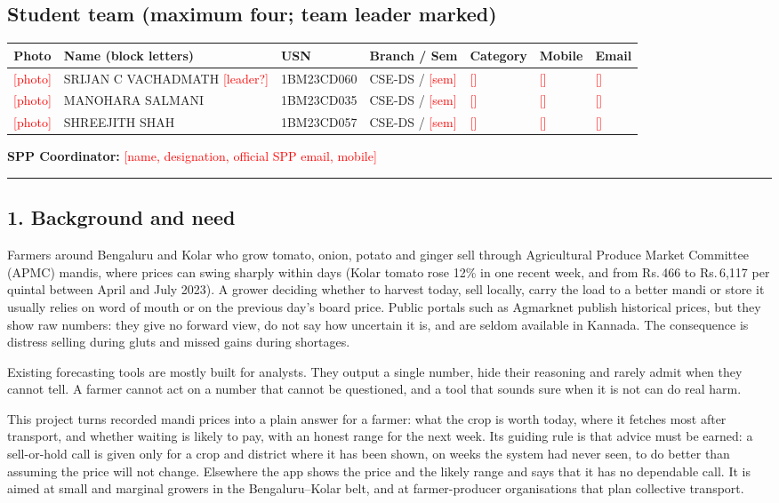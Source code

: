 \documentclass[11pt,a4paper]{article}
\newcommand{\todo}[1]{\textcolor{red}{[#1]}}
\newcommand{\psec}[1]{\vspace{4pt}\noindent{\large\bfseries #1}\par\vspace{1pt}\hrule\vspace{4pt}}
\begin{document}
\subsection*{Student team (maximum four; team leader marked)}
\begin{tabularx}{\textwidth}{@{}c>{\raggedright}p{3.4cm}lllll@{}}
\toprule
Photo & Name (block letters) & USN & Branch / Sem & Category & Mobile & Email\\
\midrule
\todo{photo} & SRIJAN C VACHADMATH \todo{leader?} & 1BM23CD060 & CSE-DS / \todo{sem} & \todo{} & \todo{} & \todo{}\\
\todo{photo} & MANOHARA SALMANI & 1BM23CD035 & CSE-DS / \todo{sem} & \todo{} & \todo{} & \todo{}\\
\todo{photo} & SHREEJITH SHAH & 1BM23CD057 & CSE-DS / \todo{sem} & \todo{} & \todo{} & \todo{}\\
\bottomrule
\end{tabularx}

\textbf{SPP Coordinator:} \todo{name, designation, official SPP email, mobile}

\psec{PART B: PROJECT DESCRIPTION}

\subsection*{1. Background and need}
Farmers around Bengaluru and Kolar who grow tomato, onion, potato and ginger sell through Agricultural Produce Market Committee (APMC) mandis, where prices can swing sharply within days (Kolar tomato rose 12\% in one recent week, and from Rs.\,466 to Rs.\,6,117 per quintal between April and July 2023). A grower deciding whether to harvest today, sell locally, carry the load to a better mandi or store it usually relies on word of mouth or on the previous day's board price. Public portals such as Agmarknet publish historical prices, but they show raw numbers: they give no forward view, do not say how uncertain it is, and are seldom available in Kannada. The consequence is distress selling during gluts and missed gains during shortages.

Existing forecasting tools are mostly built for analysts. They output a single number, hide their reasoning and rarely admit when they cannot tell. A farmer cannot act on a number that cannot be questioned, and a tool that sounds sure when it is not can do real harm.

This project turns recorded mandi prices into a plain answer for a farmer: what the crop is worth today, where it fetches most after transport, and whether waiting is likely to pay, with an honest range for the next week. Its guiding rule is that advice must be earned: a sell-or-hold call is given only for a crop and district where it has been shown, on weeks the system had never seen, to do better than assuming the price will not change. Elsewhere the app shows the price and the likely range and says that it has no dependable call. It is aimed at small and marginal growers in the Bengaluru--Kolar belt, and at farmer-producer organisations that plan collective transport.
\end{document}
